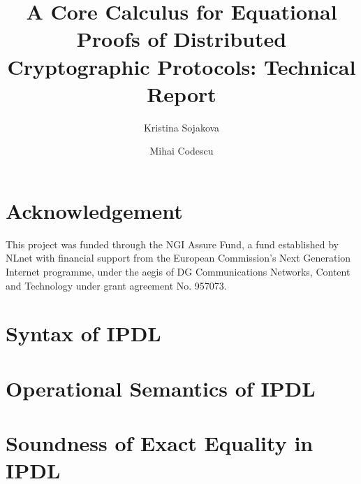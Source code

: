 \documentclass[11pt,hidelinks]{article}
\newcommand{\ipdl}{\textsf{IPDL} }
\begin{document}
\title{A Core Calculus for Equational Proofs of Distributed Cryptographic Protocols: Technical Report}
\author{Kristina Sojakova \and Mihai Codescu}
\date{}
\maketitle

\section*{\small Acknowledgement}
This project was funded through the NGI Assure Fund, a fund established by NLnet with financial support from the European Commission's Next Generation Internet programme, under the aegis of DG Communications Networks, Content and Technology under grant agreement No. 957073.

\section{Syntax of \ipdl}


\section{Operational Semantics of \ipdl}


\section{Soundness of Exact Equality in \ipdl}


\end{document}
